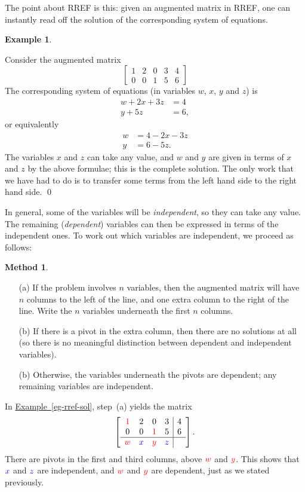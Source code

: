 \documentclass[a4paper]{book}
\newcommand{\RED}[1]{{\color{red}#1}}
\newcommand{\BLUE}[1]{{\color{blue}#1}}
\newcommand{\PURPLE}[1]{{\color{purple}#1}}
\renewcommand{\:}{\colon}
\newcommand{\bilabel}[1]{\hypertarget{#1}{\label{#1}}}
\newcommand{\biref}[2]{\hyperlink{#2}{#1~\ref*{#2}}}
\newcommand{\DEFN}[1]{\PURPLE{\emph{#1}}}
\theoremstyle{definition}
\newtheorem{example}[theorem]{Example}
\newtheorem{method}[theorem]{Method}
\begin{document}
The point about RREF is this: given an augmented matrix in RREF, one
can instantly read off the solution of the corresponding system of
equations. 
\begin{example}\bilabel{eg-rref-sol}
 Consider the augmented matrix
 \[ \left[\begin{array}{cccc|c}
     1 & 2 & 0 & 3 & 4 \\ 
     0 & 0 & 1 & 5 & 6 
    \end{array}\right]
 \] 
 The corresponding system of equations (in variables $w$, $x$, $y$ and
 $z$) is
 \begin{align*}
  w + 2x + 3z &= 4 \\
         y+5z &= 6,
 \end{align*}
 or equivalently
 \begin{align*}
  w &= 4 - 2x - 3z \\
  y &= 6-5z.
 \end{align*}
 The variables $x$ and $z$ can take any value, and $w$ and $y$ are
 given in terms of $x$ and $z$ by the above formulae; this is the
 complete solution.  The only work that we have had to do is to
 transfer some terms from the left hand side to the right hand side.
 \qed
\end{example}
In general, some of the variables will be \DEFN{independent}, so they
can take any value.  The remaining (\DEFN{dependent}) variables can
then be expressed in terms of the independent ones.  To work out which
variables are independent, we proceed as follows:
\begin{method}\bilabel{alg-dep-var}
 \begin{itemize}
  \item[(a)] If the problem involves $n$ variables, then the augmented
   matrix will have $n$ columns to the left of the line, and one extra
   column to the right of the line.  Write the $n$ variables underneath
   the first $n$ columns.
  \item[(b)] If there is a pivot in the extra column, then there are no
   solutions at all (so there is no meaningful distinction between
   dependent and independent variables).
  \item[(b)] Otherwise, the variables underneath the pivots are
   dependent; any remaining variables are independent. 
 \end{itemize}
\end{method}
In \biref{Example}{eg-rref-sol}, step~(a) yields the matrix
\[  \left[\begin{array}{cccc|c}
     \RED{1} & 2        &      0  & 3 & 4 \\ 
     0       & 0        & \RED{1} & 5 & 6 \\ \hline
     \RED{w} & \BLUE{x} & \RED{y} & \BLUE{z} &
    \end{array}\right].
\]
There are pivots in the first and third columns, above $\RED{w}$ and
$\RED{y}$.  This shows that $\BLUE{x}$ and $\BLUE{z}$ are independent,
and $\RED{w}$ and $\RED{y}$ are dependent, just as we stated
previously.  
\end{document}

